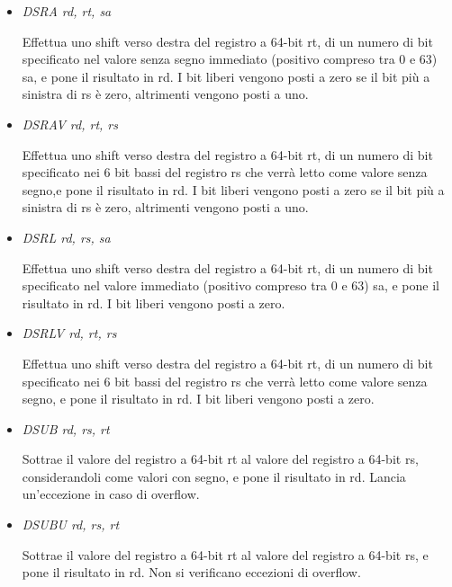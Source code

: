 \documentclass[letterpaper,10pt,italian]{sphinxmanual}
\begin{document}
\begin{itemize}
\item {} 
\emph{DSRA rd, rt, sa}

Effettua uno shift verso destra del registro a 64-bit rt, di un numero di
bit specificato nel valore senza segno immediato (positivo compreso tra 0 e
63) sa, e pone il risultato in rd. I bit liberi vengono posti a zero se il
bit più a sinistra di rs è zero, altrimenti vengono posti a uno.

\item {} 
\emph{DSRAV rd, rt, rs}

Effettua uno shift verso destra del registro a 64-bit rt, di un numero di
bit specificato nei 6 bit bassi del registro rs che verrà letto come valore
senza segno,e pone il risultato in rd.  I bit liberi vengono posti a zero se
il bit più a sinistra di rs è zero, altrimenti vengono posti a uno.

\item {} 
\emph{DSRL rd, rs, sa}

Effettua uno shift verso destra del registro a 64-bit rt, di un numero di
bit specificato nel valore immediato (positivo compreso tra 0 e 63) sa, e
pone il risultato in rd. I bit liberi vengono posti a zero.

\item {} 
\emph{DSRLV rd, rt, rs}

Effettua uno shift verso destra del registro a 64-bit rt, di un numero di
bit specificato nei 6 bit bassi del registro rs che verrà letto come valore
senza segno, e pone il risultato in rd. I bit liberi vengono posti a zero.

\item {} 
\emph{DSUB rd, rs, rt}

Sottrae il valore del registro a 64-bit rt al valore del registro a 64-bit
rs, considerandoli come valori con segno, e pone il risultato in rd. Lancia
un'eccezione in caso di overflow.

\item {} 
\emph{DSUBU rd, rs, rt}

Sottrae il valore del registro a 64-bit rt al valore del registro a 64-bit
rs, e pone il risultato in rd.  Non si verificano eccezioni di overflow.

\end{itemize}
\end{document}
